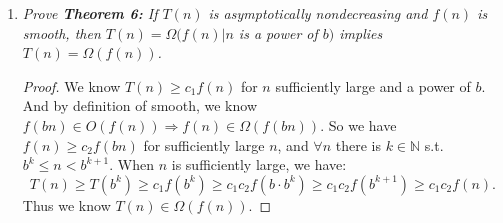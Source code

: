 \documentclass[10pt,oneside,reqno]{amsart}
\theoremstyle{plain}
\theoremstyle{definition}
\begin{document}
\begin{enumerate}[label=\arabic*.]
\item \textit{Prove \textbf{Theorem 6:} If $T(n)$ is asymptotically nondecreasing and $f(n)$ is smooth, then $T(n) = \Omega(f(n)|n$ is a power of $b)$ implies $T(n) = \Omega(f(n))$. }

\begin{proof}
We know $T(n) \geq c_1f(n)$ for $n$ sufficiently large and a power of $b$. And by definition of smooth, we know $f(bn) \in O(f(n)) \Rightarrow f(n) \in \Omega (f(bn))$. So we have $f(n) \geq c_2f(bn)$ for sufficiently large $n$, and $\forall n$ there is $k \in \mathbb{N}$ s.t. $b^k \leq n < b^{k + 1}$. When $n$ is sufficiently large, we have: 
$$
T(n) \geq T(b^k) \geq c_1f(b^k)  \geq c_1c_2f(b\cdot b^k) \geq c_1c_2f(b^{k + 1}) \geq c_1c_2f(n).
$$
Thus we know $T(n) \in \Omega(f(n))$. 
\end{proof}
\end{enumerate}
\end{document}
